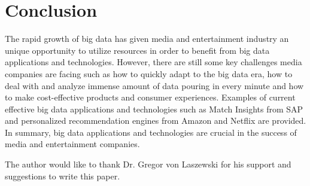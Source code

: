 \documentclass[sigconf]{acmart}
\begin{document}
\section{Conclusion}

The rapid growth of big data has given media and entertainment industry an unique opportunity to utilize resources in order to benefit from big data applications and technologies. However, there are still some key challenges media companies are facing such as how to quickly adapt to the big data era, how to deal with and analyze immense amount of data pouring in every minute and how to make cost-effective products and consumer experiences. Examples of current effective big data applications and technologies such as Match Insights from SAP and personalized recommendation engines from Amazon and Netflix are provided. In summary, big data applications and technologies are crucial in the success of media and entertainment companies. 

\begin{acks}

  The author would like to thank Dr. Gregor von Laszewski for his support and suggestions to write this paper.

\end{acks}


 


\end{document}
